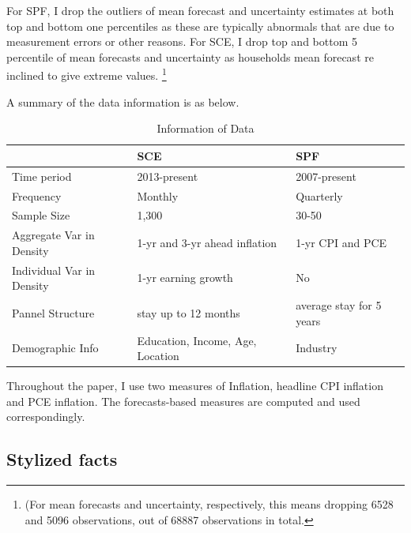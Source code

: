 \documentclass[]{article}
\begin{document}
	For SPF, I drop the outliers of mean forecast and uncertainty estimates at both top and bottom one percentiles as these are typically abnormals that are due to measurement errors or other reasons.   For SCE, I drop top and bottom 5 percentile of mean forecasts and uncertainty as households mean forecast re inclined to give extreme values. \footnote{(For mean forecasts and uncertainty, respectively, this means dropping 6528 and 5096 observations, out of 68887 observations in total.}
	
	
	A summary of the data information is as below. 
	
	\begin{table}[ht]
		\caption{Information of Data}
		\label{DataInfo}
		\begin{tabular}{lll} 
			
			\hline 
			& SCE & SPF        \\
			\hline 
			Time period                                    & 2013-present                            & 2007-present             \\
			Frequency                                      & Monthly                                 & Quarterly                \\
			Sample Size                                    & 1,300                                   & 30-50                    \\
			Aggregate Var in Density                       & 1-yr  and 3-yr ahead inflation          & 1-yr CPI and PCE         \\
			Individual Var in Density                      & 1-yr earning growth                     & No                       \\
			Pannel Structure                               & stay up to 12 months                    & average stay for 5 years \\
			Demographic Info                        & Education, Income, Age, Location        & Industry    \\
			\hline 
		\end{tabular}
	\end{table}
	
	Throughout the paper, I use two measures of Inflation, headline CPI inflation and PCE inflation. The forecasts-based measures are computed and used correspondingly.  
	
	\subsection{Stylized facts}
	
\end{document}
